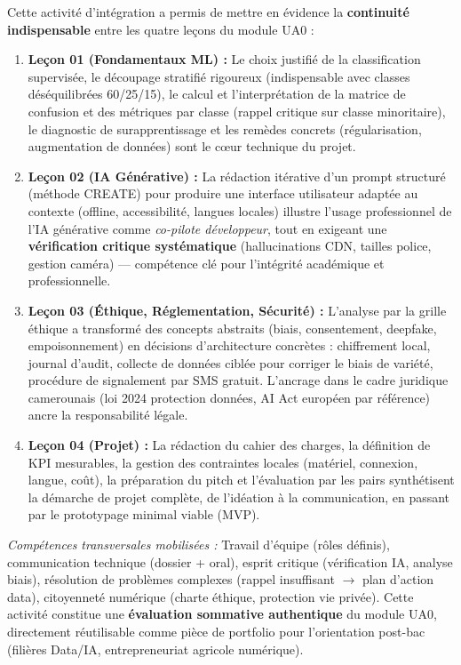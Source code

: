\documentclass[11pt]{article}
\newcounter{popsec}
\newcounter{popsub}
\newcommand{\courssub}[1]{%
  \stepcounter{popsub}%
  \par\vspace{9pt}\noindent{\popxbold\fontsize{11.5}{13}\selectfont\color{popink}{\color{poporange}\thepopsec.\thepopsub}\hspace{6pt}#1}\par\nopagebreak\vspace{4pt}
}
\begin{document}
\courssub{Bilan de l'activité}
Cette activité d'intégration a permis de mettre en évidence la \textbf{continuité indispensable} entre les quatre leçons du module UA0 :
\begin{enumerate}
    \item \textbf{Leçon 01 (Fondamentaux ML) :} Le choix justifié de la classification supervisée, le découpage stratifié rigoureux (indispensable avec classes déséquilibrées 60/25/15), le calcul et l'interprétation de la matrice de confusion et des métriques par classe (rappel critique sur classe minoritaire), le diagnostic de surapprentissage et les remèdes concrets (régularisation, augmentation de données) sont le cœur technique du projet.
    \item \textbf{Leçon 02 (IA Générative) :} La rédaction itérative d'un prompt structuré (méthode CREATE) pour produire une interface utilisateur adaptée au contexte (offline, accessibilité, langues locales) illustre l'usage professionnel de l'IA générative comme \emph{co-pilote développeur}, tout en exigeant une \textbf{vérification critique systématique} (hallucinations CDN, tailles police, gestion caméra) — compétence clé pour l'intégrité académique et professionnelle.
    \item \textbf{Leçon 03 (Éthique, Réglementation, Sécurité) :} L'analyse par la grille éthique a transformé des concepts abstraits (biais, consentement, deepfake, empoisonnement) en décisions d'architecture concrètes : chiffrement local, journal d'audit, collecte de données ciblée pour corriger le biais de variété, procédure de signalement par SMS gratuit. L'ancrage dans le cadre juridique camerounais (loi 2024 protection données, AI Act européen par référence) ancre la responsabilité légale.
    \item \textbf{Leçon 04 (Projet) :} La rédaction du cahier des charges, la définition de KPI mesurables, la gestion des contraintes locales (matériel, connexion, langue, coût), la préparation du pitch et l'évaluation par les pairs synthétisent la démarche de projet complète, de l'idéation à la communication, en passant par le prototypage minimal viable (MVP).
\end{enumerate}
\emph{Compétences transversales mobilisées :} Travail d'équipe (rôles définis), communication technique (dossier + oral), esprit critique (vérification IA, analyse biais), résolution de problèmes complexes (rappel insuffisant $\rightarrow$ plan d'action data), citoyenneté numérique (charte éthique, protection vie privée). Cette activité constitue une \textbf{évaluation sommative authentique} du module UA0, directement réutilisable comme pièce de portfolio pour l'orientation post-bac (filières Data/IA, entrepreneuriat agricole numérique).
\end{document}
